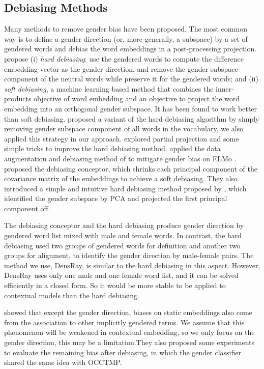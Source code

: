 \subsection{Debiasing Methods}
Many methods to remove gender bias have been proposed. The most common way is to define a gender direction (or, more generally, a subspace) by a set of gendered words and debias the word embeddings in a post-processing projection.  propose (i) \emph{hard debiasing}: use the gendered words to compute the difference embedding vector as the gender direction, and remove the gender subspace component of the neutral words while preserve it for the gendered words; and (ii) \emph{soft debiasing}, a machine learning based method that combines the inner-products objective of word embedding and an objective to project the word embedding into an orthogonal gender subspace. It has been found to work better than soft debiasing.  proposed a variant of the hard debiasing algorithm by simply removing gender subspace component of all words in the vocabulary, we also applied this strategy in our approach.  explored partial projection and some simple tricks to improve the hard debiasing method.
 applied the data augmentation and debiasing method of  to mitigate gender bias on ELMo  \cite{Peters:2018}.  proposed the debiasing conceptor, which shrinks each principal component of the covariance matrix of the embeddings to achieve a soft debiasing. They also introduced a simple and intuitive hard debiasing method proposed by \cite{mu2018all}, which identified the gender subspace by PCA and projected the first principal component off.  

The debiasing conceptor and the  hard debiasing produce gender direction by gendered word list mixed with male and female words. In contrast, the  hard debiasing used two groups of gendered words for definition and another two groups for alignment, to identify the gender direction by male-female pairs. The method we use, DensRay, is similar to the  hard debiasing in this aspect. However, DensRay uses only one male and one female word list, and it can be solved efficiently in a closed form. So it would be more stable to be applied to contextual models than the  hard debiasing. 
 
 showed that except the gender direction, biases on static embeddings also come from the association to other implicitly gendered terms. We assume that this phenomenon will be weakened in contextual embedding, so we only focus on the gender direction, this may be a limitation.They also proposed some experiments to evaluate the remaining bias after debiasing, in which the gender classifier shared the same idea with OCCTMP.



